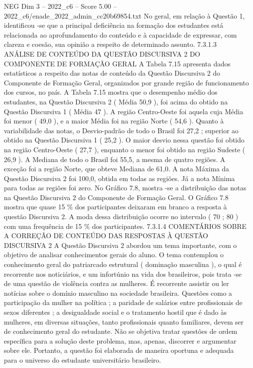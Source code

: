 \begin{textsample}{NEG Dim 3 – 2022\_c6 – Score 5.00 – 2022\_c6/enade\_2022\_admin\_cc20b69854.txt}
No geral, em relação à Questão 1, identificou -se que a principal deficiência na formação dos estudantes está relacionada ao aprofundamento do conteúdo e à capacidade de expressar, com clareza e coesão, sua opinião a respeito de determinado assunto. 7.3.1.3 ANÁLISE DE CONTEÚDO DA QUESTÃO DISCURSIVA 2 DO COMPONENTE DE FORMAÇÃO GERAL A Tabela 7.15 apresenta dados estatísticos a respeito das notas de conteúdo da Questão Discursiva 2 do Componente de Formação Geral, organizados por grande região de funcionamento dos cursos, no país.
A Tabela 7.15 mostra que o desempenho médio dos estudantes, na Questão Discursiva 2 ( Média 50,9 ), foi acima do obtido na Questão Discursiva 1 ( Média 47 ).
A região Centro-Oeste foi aquela cuja Média foi menor ( 49,0 ), e a maior Média foi na região Norte ( 54,6 ).
Quanto à variabilidade das notas, o Desvio-padrão de todo o Brasil foi 27,2 ; superior ao obtido na Questão Discursiva 1 ( 25,2 ).
O maior desvio nessa questão foi obtido na região Centro-Oeste ( 27,7 ), enquanto o menor foi obtido na região Sudeste ( 26,9 ).
A Mediana de todo o Brasil foi 55,5, a mesma de quatro regiões.
A exceção foi a região Norte, que obteve Mediana de 61,0.
A nota Máxima da Questão Discursiva 2 foi 100,0, obtida em todas as regiões.
Já a nota Mínima para todas as regiões foi zero.
No Gráfico 7.8, mostra -se a distribuição das notas na Questão Discursiva 2 do Componente de Formação Geral.
O Gráfico 7.8 mostra que quase 15 \% dos participantes deixaram em branco a resposta à questão Discursiva 2.
A moda dessa distribuição ocorre no intervalo ( 70 ; 80 ) com uma frequência de 15 \% dos participantes. 7.3.1.4 COMENTÁRIOS SOBRE A CORREÇÃO DE CONTEÚDO DAS RESPOSTAS À QUESTÃO DISCURSIVA 2 A Questão Discursiva 2 abordou um tema importante, com o objetivo de analisar conhecimentos gerais do aluno.
O tema contemplou o conhecimento geral do patriarcado estrutural ( dominação masculina ), o qual é recorrente nos noticiários, e um infortúnio na vida dos brasileiros, pois trata -se de uma questão de violência contra as mulheres.
É recorrente assistir ou ler notícias sobre o domínio masculino na sociedade brasileira.
Questões como a participação da mulher na política ; a paridade de salários entre profissionais de sexos diferentes ; a desigualdade social e o tratamento hostil que é dado às mulheres, em diversas situações, tanto profissionais quanto familiares, devem ser de conhecimento geral do estudante.
Não se objetiva tratar questões de ordem específica para a solução deste problema, mas, apenas, discorrer e argumentar sobre ele.
Portanto, a questão foi elaborada de maneira oportuna e adequada para o universo do estudante universitário brasileiro.

\end{textsample}
